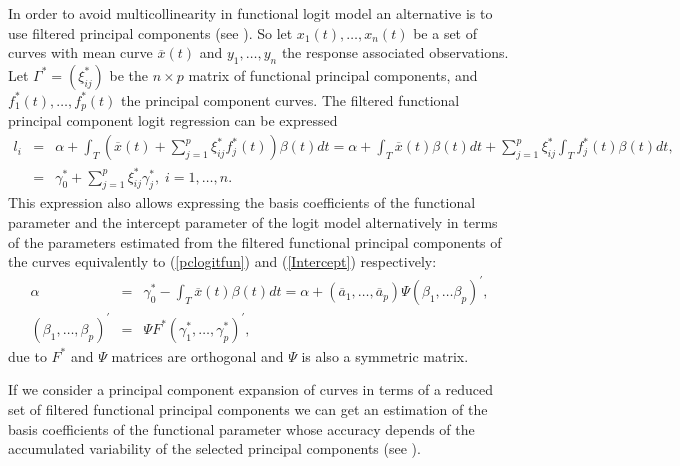 In order to avoid multicollinearity in functional logit model an alternative is to use filtered principal components (see \citealp{Escabias04}). So let $x_{1}\left( t\right) ,\ldots ,x_{n}\left( t\right) $ be a set of curves with mean curve $\overline{x}\left( t\right)$ and $y_{1},\ldots,y_{n}$ the response associated observations. Let $\Gamma^{\ast}=(\xi_{ij}^{\ast})$ be the $n \times p$ matrix of functional principal components, and $f_1^{\ast}(t),\ldots,f_p^{\ast}(t)$ the principal component curves. The filtered functional principal component logit regression can be expressed
\begin{eqnarray*}
l_{i}&=&\alpha +\int_{T} \left(\overline{x}(t) + \sum_{j=1}^{p }\xi_{ij}^{\ast}f_{j}^{\ast}\left( t\right) \right)  \beta \left( t\right)dt
=\alpha
+\int_{T} \overline{x}(t) \beta \left( t\right)dt + \sum_{j=1}^{p }\xi_{ij}^{\ast} \int_{T} f_{j}^{\ast}\left( t\right) \beta \left( t\right)dt, \\
&=&\gamma_0^{\ast}+\sum_{j=1}^{p }\xi_{ij}^{\ast} \gamma_j^{\ast},\;i=1,\ldots ,n.
\end{eqnarray*}
This expression also allows expressing the basis coefficients of the functional parameter and the intercept parameter of the logit model alternatively in terms of the parameters estimated from the filtered functional principal components of the curves equivalently to (\ref{pclogitfun}) and (\ref{Intercept}) respectively:
\begin{eqnarray}
\alpha &=& \gamma_0^{\ast} - \int_{T} \overline{x}(t) \beta \left( t\right)dt = \alpha +(\overline{a}_1,\ldots,\overline{a}_p) \Psi (\beta_1,\ldots\beta_p)^{\prime}, \\
(\beta_1,\ldots,\beta_p)^{\prime} &=& \Psi F^{\ast} (\gamma_1^{\ast},\ldots, \gamma_p^{\ast})^{\prime},
\label{filteredPCA}
\end{eqnarray}
due to $F^{\ast}$ and $\Psi$ matrices are orthogonal and $\Psi$ is also a symmetric matrix.

If we consider a principal component expansion of curves in terms of a reduced set of filtered functional principal components we can get an estimation of the basis coefficients of the functional parameter whose accuracy depends of the accumulated variability of the selected principal components (see \citealp{Escabias04}).

